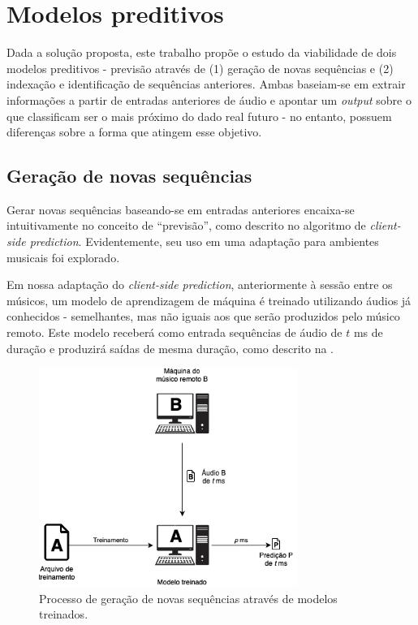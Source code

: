 \section{Modelos preditivos}

Dada a solução proposta, este trabalho propõe o estudo da viabilidade de dois modelos preditivos - previsão através de (1) geração de novas sequências e (2) indexação e identificação de sequências anteriores. Ambas baseiam-se em extrair informações a partir de entradas anteriores de áudio e apontar um \textit{output} sobre o que classificam ser o mais próximo do dado real futuro - no entanto, possuem diferenças sobre a forma que atingem esse objetivo.

\subsection{Geração de novas sequências}

Gerar novas sequências baseando-se em entradas anteriores encaixa-se intuitivamente no conceito de ``previsão'', como descrito no algoritmo de \textit{client-side prediction}. Evidentemente, seu uso em uma adaptação para ambientes musicais foi explorado.

Em nossa adaptação do \textit{client-side prediction}, anteriormente à sessão entre os músicos, um modelo de aprendizagem de máquina é treinado utilizando áudios já conhecidos -  semelhantes, mas não iguais aos que serão produzidos pelo músico remoto. Este modelo receberá como entrada sequências de áudio de $t$ ms de duração e produzirá saídas de mesma duração, como descrito na .

\begin{figure}[htbp]
    \centering
    \includegraphics[width=0.75\textwidth]{images/prediction-model.png}
    \caption{Processo de geração de novas sequências através de modelos treinados.}
    \label{fig:generative_model}
\end{figure}

